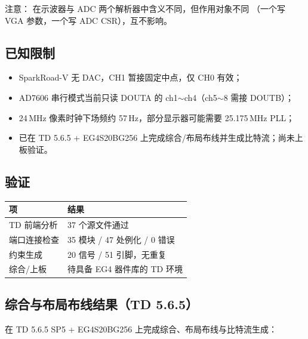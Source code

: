 注意： 在示波器与 ADC 两个解析器中含义不同，但作用对象不同
（一个写 VGA 参数，一个写 ADC CSR），互不影响。

\subsection{已知限制}

\begin{itemize}[leftmargin=2em,itemsep=2pt]
  \item SparkRoad-V 无 DAC，CH1 暂接固定中点，仅 CH0 有效；
  \item AD7606 串行模式当前只读 DOUTA 的 ch1$\sim$ch4（ch5$\sim$8 需接 DOUTB）；
  \item 24\,MHz 像素时钟下场频约 57\,Hz，部分显示器可能需要 25.175\,MHz PLL；
  \item 已在 TD 5.6.5 + EG4S20BG256 上完成综合/布局布线并生成比特流；尚未上板验证。
\end{itemize}

\subsection{验证}

\begin{center}
\small
\begin{tabular}{ll}
\toprule
项 & 结果\\
\midrule
TD 前端分析 & 37 个源文件通过\\
端口连接检查 & 35 模块 / 47 处例化 / 0 错误\\
约束生成 & 20 信号 / 51 引脚，无重复\\
综合/上板 & 待具备 EG4 器件库的 TD 环境\\
\bottomrule
\end{tabular}
\end{center}

\subsection{综合与布局布线结果（TD 5.6.5）}

在 TD 5.6.5 SP5 + EG4S20BG256 上完成综合、布局布线与比特流生成：

